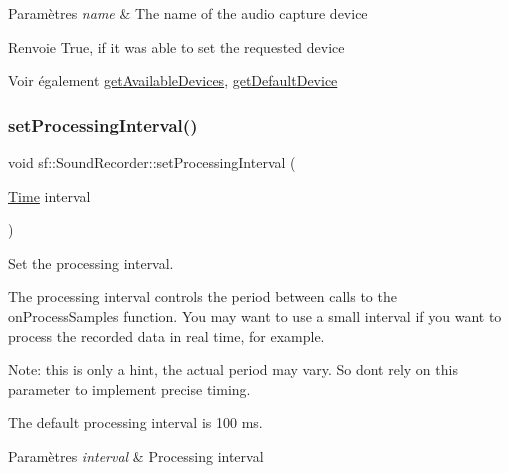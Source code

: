 \begin{DoxyParams}{Paramètres}
{\em name} & The name of the audio capture device\\
\hline
\end{DoxyParams}
\begin{DoxyReturn}{Renvoie}
True, if it was able to set the requested device
\end{DoxyReturn}
\begin{DoxySeeAlso}{Voir également}
\hyperlink{classsf_1_1SoundRecorder_a26198c5c11efcd61f426f326fe314afe}{get\+Available\+Devices}, \hyperlink{classsf_1_1SoundRecorder_ad1d450a80642dab4b632999d72a1bf23}{get\+Default\+Device} 
\end{DoxySeeAlso}
\mbox{\label{classsf_1_1SoundRecorder_a85b7fb8a86c08b5084f8f142767bccf6}} 
\subsubsection{\texorpdfstring{set\+Processing\+Interval()}{setProcessingInterval()}}
{\footnotesize\ttfamily void sf\+::\+Sound\+Recorder\+::set\+Processing\+Interval (\begin{DoxyParamCaption}\item[{\hyperlink{classsf_1_1Time}{Time}}]{interval }\end{DoxyParamCaption})\hspace{0.3cm}{\ttfamily [protected]}}



Set the processing interval. 

The processing interval controls the period between calls to the on\+Process\+Samples function. You may want to use a small interval if you want to process the recorded data in real time, for example.

Note\+: this is only a hint, the actual period may vary. So don\textquotesingle{}t rely on this parameter to implement precise timing.

The default processing interval is 100 ms.


\begin{DoxyParams}{Paramètres}
{\em interval} & Processing interval \\
\hline
\end{DoxyParams}
\mbox{\label{classsf_1_1SoundRecorder_a715f0fd2f228c83d79aaedca562ae51f}} 
